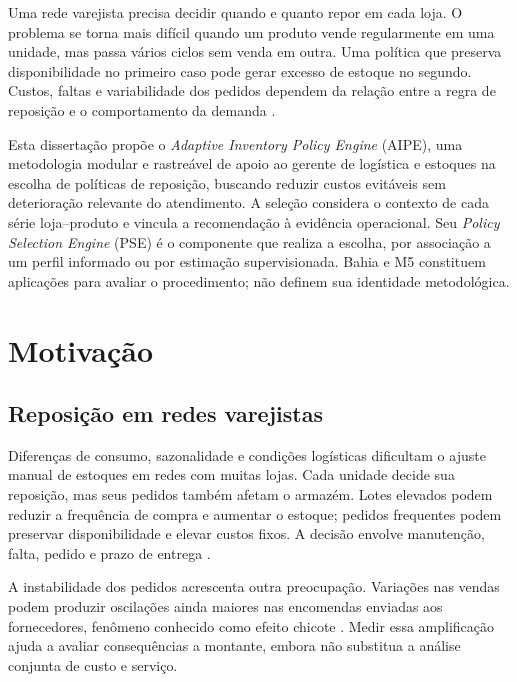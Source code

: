 
Uma rede varejista precisa decidir quando e quanto repor em cada loja. O problema se torna mais difícil quando um produto vende regularmente em uma unidade, mas passa vários ciclos sem venda em outra. Uma política que preserva disponibilidade no primeiro caso pode gerar excesso de estoque no segundo. Custos, faltas e variabilidade dos pedidos dependem da relação entre a regra de reposição e o comportamento da demanda \citep{Axsater2006InventoryControl,Syntetos2005Categorization}.

Esta dissertação propõe o \textit{Adaptive Inventory Policy Engine} (AIPE), uma metodologia modular e rastreável de apoio ao gerente de logística e estoques na escolha de políticas de reposição, buscando reduzir custos evitáveis sem deterioração relevante do atendimento. A seleção considera o contexto de cada série loja--produto e vincula a recomendação à evidência operacional. Seu \textit{Policy Selection Engine} (PSE) é o componente que realiza a escolha, por associação a um perfil informado ou por estimação supervisionada. Bahia e M5 constituem aplicações para avaliar o procedimento; não definem sua identidade metodológica.

\section{Motivação}

\subsection{Reposição em redes varejistas}

Diferenças de consumo, sazonalidade e condições logísticas dificultam o ajuste manual de estoques em redes com muitas lojas. Cada unidade decide sua reposição, mas seus pedidos também afetam o armazém. Lotes elevados podem reduzir a frequência de compra e aumentar o estoque; pedidos frequentes podem preservar disponibilidade e elevar custos fixos. A decisão envolve manutenção, falta, pedido e prazo de entrega \citep{Axsater2006InventoryControl,Zipkin2000FoundationsInventory}.

A instabilidade dos pedidos acrescenta outra preocupação. Variações nas vendas podem produzir oscilações ainda maiores nas encomendas enviadas aos fornecedores, fenômeno conhecido como efeito chicote \citep{LeePadmanabhanWhang1997Bullwhip}. Medir essa amplificação ajuda a avaliar consequências a montante, embora não substitua a análise conjunta de custo e serviço.

